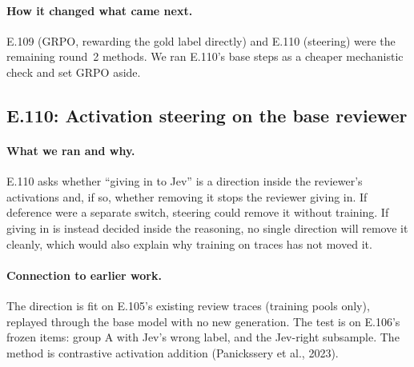 \documentclass[11pt]{article}
\renewcommand{\_}{\origunderscore\allowbreak}
\begin{document}
\paragraph{How it changed what came next.}
E.109 (GRPO, rewarding the gold label directly) and E.110 (steering) were the remaining round~2 methods. We ran E.110's base steps as a cheaper mechanistic check and set GRPO aside.

\subsection{E.110: Activation steering on the base reviewer}\label{sec:e110}

\paragraph{What we ran and why.}
E.110 asks whether ``giving in to Jev'' is a direction inside the reviewer's activations and, if so, whether removing it stops the reviewer giving in. If deference were a separate switch, steering could remove it without training. If giving in is instead decided inside the reasoning, no single direction will remove it cleanly, which would also explain why training on traces has not moved it.

\paragraph{Connection to earlier work.}
The direction is fit on E.105's existing review traces (training pools only), replayed through the base model with no new generation. The test is on E.106's frozen items: group A with Jev's wrong label, and the Jev-right subsample. The method is contrastive activation addition (Panickssery et al., 2023).
\end{document}
